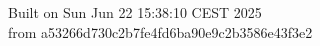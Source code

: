 {\noindent Built on Sun Jun 22 15:38:10 CEST 2025} \\ 
 {\noindent from a53266d730c2b7fe4fd6ba90e9c2b3586e43f3e2}
